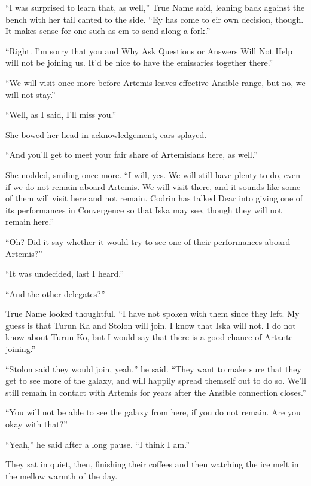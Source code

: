 ``I was surprised to learn that, as well,'' True Name said, leaning back against the bench with her tail canted to the side. ``Ey has come to eir own decision, though. It makes sense for one such as em to send along a fork.''

``Right. I'm sorry that you and Why Ask Questions or Answers Will Not Help will not be joining us. It'd be nice to have the emissaries together there.''

``We will visit once more before Artemis leaves effective Ansible range, but no, we will not stay.''

``Well, as I said, I'll miss you.''

She bowed her head in acknowledgement, ears splayed.

``And you'll get to meet your fair share of Artemisians here, as well.''

She nodded, smiling once more. ``I will, yes. We will still have plenty to do, even if we do not remain aboard Artemis. We will visit there, and it sounds like some of them will visit here and not remain. Codrin has talked Dear into giving one of its performances in Convergence so that Iska may see, though they will not remain here.''

``Oh? Did it say whether it would try to see one of their performances aboard Artemis?''

``It was undecided, last I heard.''

``And the other delegates?''

True Name looked thoughtful. ``I have not spoken with them since they left. My guess is that Turun Ka and Stolon will join. I know that Iska will not. I do not know about Turun Ko, but I would say that there is a good chance of Artante joining.''

``Stolon said they would join, yeah,'' he said. ``They want to make sure that they get to see more of the galaxy, and will happily spread themself out to do so. We'll still remain in contact with Artemis for years after the Ansible connection closes.''

``You will not be able to see the galaxy from here, if you do not remain. Are you okay with that?''

``Yeah,'' he said after a long pause. ``I think I am.''

They sat in quiet, then, finishing their coffees and then watching the ice melt in the mellow warmth of the day.
